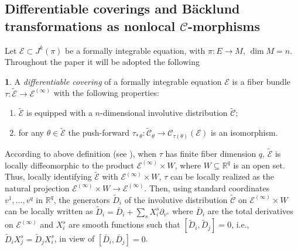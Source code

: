 \documentclass[12pt,english]{elsarticle}
\theoremstyle{plain}
\theoremstyle{plain}
\theoremstyle{remark}
\theoremstyle{plain}
\theoremstyle{definition}
\newtheorem{defn}[thm]{\protect\definitionname}
\theoremstyle{definition}
\providecommand{\definitionname}{Definition}
\begin{document}
\subsection{Differentiable coverings and B\"acklund transformations as nonlocal
$\mathcal{C}$-morphisms}
\label{subsec:Cov-BT}

Let $\mathcal{E}\subset J^{k}(\pi )$ be a formally integrable equation,
with $\pi :E\rightarrow M$, $\dim M=n$. Throughout the paper it will be
adopted the following
%
\begin{defn}
\label{defn15}
A \textit{differentiable covering} of a formally integrable equation
$\mathcal{E}$ is a fiber bundle
$\tau :\tilde{\mathcal{E}}\longrightarrow \mathcal{E}^{(\infty )}$ with
the following properties:
\end{defn}
%
\begin{enumerate}
%
\item $\tilde{\mathcal{E}}$ is equipped with a $n$-dimensional involutive
distribution $\tilde{\mathcal{C}}$;
%
\item for any $\theta \in \tilde{\mathcal{E}}$ the push-forward
$\tau _{*\,\theta}:\tilde{\mathcal{C}}_{\theta}\longrightarrow
\mathcal{C}_{\tau (\theta )}(\mathcal{E})$ is an isomorphism.
%
\end{enumerate}
%


According to above definition (see \cite{B_KrV}), when $\tau $ has finite
fiber dimension $q$, $\tilde{\mathcal{E}}$ is locally diffeomorphic to
the product $\mathcal{E}^{(\infty )}\times W$, where
$W\subseteq \mathbb{R}^{q}$ is an open set. Thus, locally identifying
$\tilde{\mathcal{E}}$ with $\mathcal{E}^{(\infty )}\times W$,
$\tau $ can be locally realized as the natural projection
$\mathcal{E}^{(\infty )}\times W\rightarrow \mathcal{E}^{(\infty )}$. Then,
using standard coordinates $v^{1},...,v^{q}$ in $\mathbb{R}^{q}$, the generators
$\tilde{D}_{i}$ of the involutive distribution $\tilde{\mathcal{C}}$ on
$\mathcal{E}^{(\infty )}\times W$ can be locally written as
$\tilde{D}_{i}=\bar{D}_{i}+\sum _{s}X_{i}^{s}\partial _{v^{s}}$ where
$\bar{D}_{i}$ are the total derivatives on $\mathcal{E}^{(\infty )}$ and
$X_{i}^{s}$ are smooth functions such that
$\left [\tilde{D}_{i},\tilde{D}_{j}\right ]=0$, i.e.,
$\tilde{D}_{i}X_{j}^{s}=\tilde{D}_{j}X_{i}^{s}$, in view of
$[\bar{D}_{i},\bar{D}_{j}]=0$.
\end{document}
